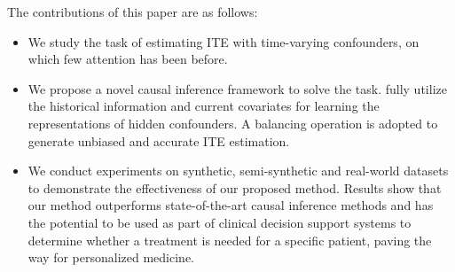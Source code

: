 The contributions of this paper are as follows:
\begin{itemize}
  \item We study the task of estimating ITE with time-varying confounders, on which few attention has been before. 
  \item We propose a novel causal inference framework \model to solve the task. \model fully utilize the historical information and current covariates for learning the representations of hidden confounders. A balancing operation is adopted to generate unbiased and accurate ITE estimation.
  \item We conduct experiments on synthetic, semi-synthetic and real-world datasets to demonstrate the effectiveness of our proposed method. Results show that our method outperforms state-of-the-art causal inference methods and 
  has the potential to be used as part of clinical decision support systems to determine whether a treatment is needed for a specific patient, paving the way for personalized medicine.
\end{itemize}

 
